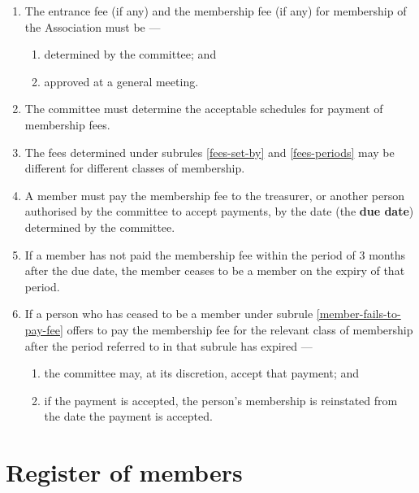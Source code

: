 \documentclass[../constitution.tex]{subfiles}
\begin{document}
\begin{enumerate}


  \item \label{fees-set-by} The entrance fee (if any) and the membership fee (if any) for membership of the Association must be ---
        \begin{enumerate}
          \item determined by the committee; and
          \item approved at a general meeting.
        \end{enumerate}

  \item \label{fees-periods} The committee must determine the acceptable schedules for payment of membership fees.


  \item The fees determined under subrules \ref{fees-set-by} and \ref{fees-periods} may be different for different classes of membership.

  \item A member must pay the membership fee to the treasurer, or another person authorised by the committee to accept payments, by the date (the \textbf{due date}) determined by the committee. \label{member-must-pay-fee}
  \item If a member has not paid the membership fee within the period of 3 months after the due date, the member ceases to be a member on the expiry of that period. \label{member-fails-to-pay-fee}
  \item \label{member-rejoins-after-failing-to-pay-fee} If a person who has ceased to be a member under subrule \ref{member-fails-to-pay-fee} offers to pay the membership fee for the relevant class of membership after the period referred to in that subrule has expired ---

        \begin{enumerate}

          \item the committee may, at its discretion, accept that payment; and
          \item if the payment is accepted, the person's membership is reinstated from the date the payment is accepted.
        \end{enumerate}
\end{enumerate}

\hypertarget{division-3-register-of-members}{%
  \section{Register of members}\label{division-3-register-of-members}}
\end{document}

